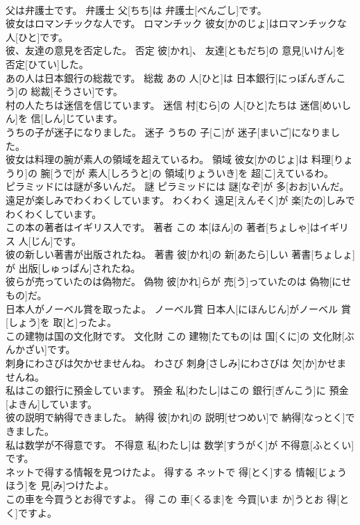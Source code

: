 \documentclass[8pt]{extreport}
\begin{document}
\begin{CJK}{UTF8}{min}
\\	父は弁護士です。	弁護士	父[ちち]は 弁護士[べんごし]です。	
\\	彼女はロマンチックな人です。	ロマンチック	彼女[かのじょ]はロマンチックな 人[ひと]です。	
\\	彼、友達の意見を否定した。	否定	彼[かれ]、 友達[ともだち]の 意見[いけん]を 否定[ひてい]した。	
\\	あの人は日本銀行の総裁です。	総裁	あの 人[ひと]は 日本銀行[にっぽんぎんこう]の 総裁[そうさい]です。	
\\	村の人たちは迷信を信じています。	迷信	村[むら]の 人[ひと]たちは 迷信[めいしん]を 信[しん]じています。	
\\	うちの子が迷子になりました。	迷子	うちの 子[こ]が 迷子[まいご]になりました。	
\\	彼女は料理の腕が素人の領域を超えているわ。	領域	彼女[かのじょ]は 料理[りょうり]の 腕[うで]が 素人[しろうと]の 領域[りょういき]を 超[こ]えているわ。	
\\	ピラミッドには謎が多いんだ。	謎	ピラミッドには 謎[なぞ]が 多[おお]いんだ。	
\\	遠足が楽しみでわくわくしています。	わくわく	遠足[えんそく]が 楽[たの]しみでわくわくしています。	
\\	この本の著者はイギリス人です。	著者	この 本[ほん]の 著者[ちょしゃ]はイギリス 人[じん]です。	
\\	彼の新しい著書が出版されたね。	著書	彼[かれ]の 新[あたら]しい 著書[ちょしょ]が 出版[しゅっぱん]されたね。	
\\	彼らが売っていたのは偽物だ。	偽物	彼[かれ]らが 売[う]っていたのは 偽物[にせもの]だ。	
\\	日本人がノーベル賞を取ったよ。	ノーベル賞	日本人[にほんじん]がノーベル 賞[しょう]を 取[と]ったよ。	
\\	この建物は国の文化財です。	文化財	この 建物[たてもの]は 国[くに]の 文化財[ぶんかざい]です。	
\\	刺身にわさびは欠かせませんね。	わさび	刺身[さしみ]にわさびは 欠[か]かせませんね。	
\\	私はこの銀行に預金しています。	預金	私[わたし]はこの 銀行[ぎんこう]に 預金[よきん]しています。	
\\	彼の説明で納得できました。	納得	彼[かれ]の 説明[せつめい]で 納得[なっとく]できました。	
\\	私は数学が不得意です。	不得意	私[わたし]は 数学[すうがく]が 不得意[ふとくい]です。	
\\	ネットで得する情報を見つけたよ。	得する	ネットで 得[とく]する 情報[じょうほう]を 見[み]つけたよ。	
\\	この車を今買うとお得ですよ。	得	この 車[くるま]を 今買[いま か]うとお 得[とく]ですよ。	

\end{CJK}
\end{document}
